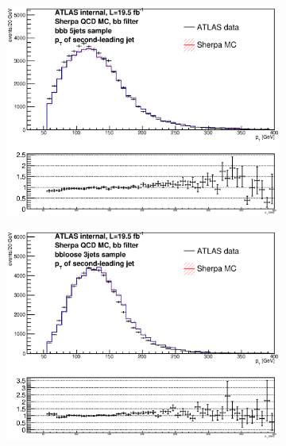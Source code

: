 \begin{figure}[phtb!]
\begin{center}
  \begin{subfigure}[$bbb$ 5+ jet category]{0.3\textwidth}\includegraphics[width=\textwidth]{MonteCarlo/figures/pt1_bbb_5jets.eps}\end{subfigure}
  \begin{subfigure}[$bbloose$ 3 jet category]{0.3\textwidth}\includegraphics[width=\textwidth]{MonteCarlo/figures/pt1_bbloose_3jets.eps}\end{subfigure}

\end{center}
\end{figure}
